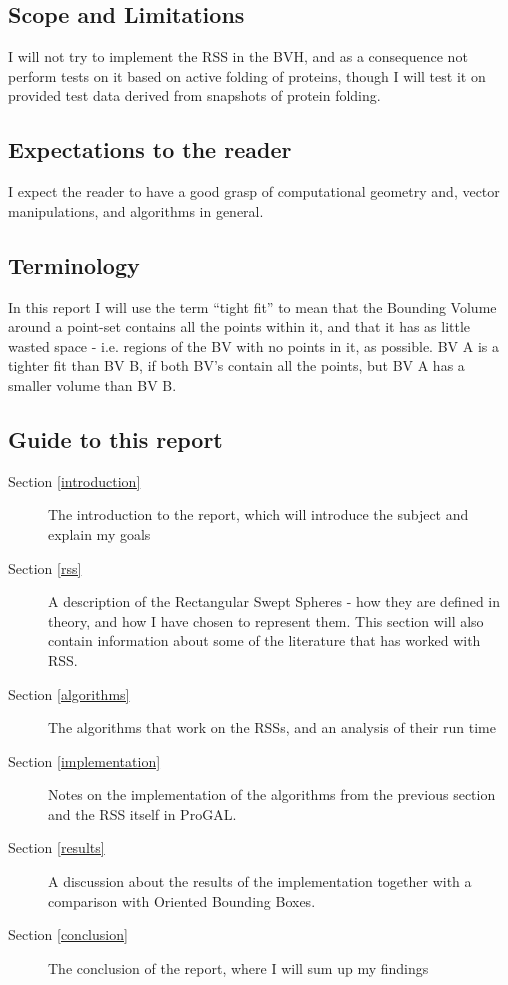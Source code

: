 \subsection{Scope and Limitations}
\label{scope}
I will not try to implement the RSS in the BVH, and as a consequence not perform tests on it based on active folding of proteins, though I will test it on provided test data derived from snapshots of protein folding.

\subsection{Expectations to the reader}
I expect the reader to have a good grasp of computational geometry and, vector manipulations, and algorithms in general.

\subsection{Terminology}
In this report I will use the term ``tight fit'' to mean that the Bounding Volume around a point-set contains all the points within it, and that it has as little wasted space - i.e. regions of the BV with no points in it, as possible. BV A is a tighter fit than BV B, if both BV's contain all the points, but BV A has a smaller volume than BV B.

\subsection{Guide to this report}
\begin{description}
\item[Section \ref{introduction}] The introduction to the report, which will introduce the subject and explain my goals
\item[Section \ref{rss}] A description of the Rectangular Swept Spheres - how they are defined in theory, and how I have chosen to represent them. This section will also contain information about some of the literature that has worked with RSS.
\item[Section \ref{algorithms}] The algorithms that work on the RSSs, and an analysis of their run time 
\item[Section \ref{implementation}] Notes on the implementation of the algorithms from the previous section and the RSS itself in ProGAL.
\item[Section \ref{results}] A discussion about the results of the implementation together with a comparison with Oriented Bounding Boxes. 
\item[Section \ref{conclusion}] The conclusion of the report, where I will sum up my findings 
\end{description}



